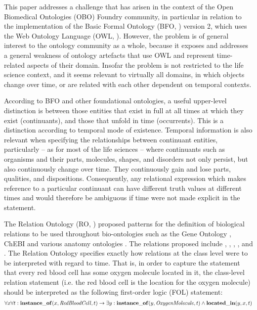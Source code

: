 


This paper addresses a challenge that has arisen in the context of the Open Biomedical Ontologies (OBO) Foundry \cite{Smith2007} community, in particular in relation to the implementation of the Basic Formal Ontology (BFO, \cite{BFO2:Graz}) version 2, which uses the Web Ontology Language (OWL, \cite{grau2008}). 
However, the problem is of general interest to the %
ontology 
community as a whole, because it exposes and addresses a general weakness 
of ontology artefacts that
use OWL and represent time-related
aspects of their domain. 
Insofar the problem is not restricted to the life science context, and it seems relevant to virtually all domains, 
in which objects change over time, or are related with each other dependent on temporal contexts.   

According to BFO and other foundational ontologies, a useful upper-level distinction is between those entities that exist in full at all times at which they exist (continuants), and those that unfold in time (occurrents). This is a distinction according to temporal mode of existence. Temporal information is also relevant when specifying the relationships between continuant entities, particularly -- as for most of the life sciences -- where continuants such as organisms and their parts, molecules, shapes, and disorders not only persist, but also continuously change over time. They continuously gain and lose parts, qualities, and dispositions. Consequently, any relational expression which makes reference to a particular continuant can have different truth values at different times and would therefore be ambiguous if time were not made explicit in the statement. 

The Relation Ontology (RO, \cite{OBO:RO}) proposed patterns for the definition of biological relations to be used throughout bio-ontologies such as the Gene Ontology \cite{go2000}, ChEBI \cite{chebinar2013} and various anatomy ontologies \cite{uberon2012}. The relations proposed include 
, , , , and  . The Relation Ontology specifies exactly how relations at the class level were to be interpreted with regard to time. That is, in order to capture the statement that every red blood cell has some oxygen molecule located in it, the class-level relation statement    (i.e. the red blood cell is the location for the oxygen molecule) should be interpreted as the following first-order logic (FOL) statement: 
\begin{equation}
\forall x \forall t : \mathrm{\mathbf{instance\_of}}(x, \mathit{RedBloodCell}, t) \rightarrow 
\exists y : \mathrm{\mathbf{instance\_of}}(y, \mathit{OxygenMolecule}, t) \wedge \mathrm{\mathbf{located\_in}}(y, x, t)
\end{equation}

